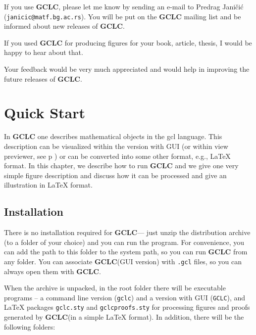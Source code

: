 \documentclass[a4paper]{book}
\newcommand{\gclc}{{\bfseries GCLC}\xspace}
\begin{document}
If you use \gclc, please let me know by sending an e-mail to 
Predrag Jani\v{c}i\'c (\verb|janicic@matf.bg.ac.rs|). You
will be put on the \gclc mailing list and be informed about 
new releases of \gclc.

If you used \gclc for producing figures for your book, article, 
thesis, I would be happy to hear about that.

Your feedback would be very much appreciated and would help in 
improving the future releases of \gclc.


\chapter{Quick Start}

In \gclc one describes mathematical objects in the {\sc gcl}
language. This description can be visualized within the version with GUI
(or within {\sc view} previewer, see p \pageref{p:view}) or can be converted 
into some other format, e.g., \LaTeX{} format. In this chapter, we describe
how to run \gclc and we give one very simple figure description and 
discuss how it can be processed and give an illustration in \LaTeX{}
format.


\section{Installation}

There is no installation required for \gclc --- just unzip
the distribution archive (to a folder of your choice) and you can
run the program. For convenience, you can add the path to this folder
to the system path, so you can run \gclc from any folder. 
You can associate \gclc (GUI version) with \verb|.gcl| files,
so you can always open them with \gclc.

When the archive is unpacked, in the root folder there will be
executable programs -- a command line version (\verb|gclc|) and 
a version with GUI (\verb|GCLC|), and \LaTeX{} packages \verb|gclc.sty| 
and \verb|gclcproofs.sty| for processing figures and proofs generated 
by \gclc (in a simple \LaTeX{} format). In addition, there will be the 
following folders:
\end{document}
